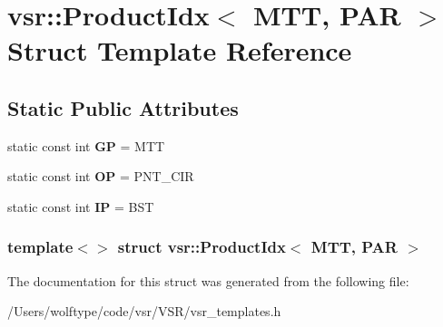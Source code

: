 \hypertarget{structvsr_1_1_product_idx_3_01_m_t_t_00_01_p_a_r_01_4}{\section{vsr\-:\-:Product\-Idx$<$ M\-T\-T, P\-A\-R $>$ Struct Template Reference}
\label{structvsr_1_1_product_idx_3_01_m_t_t_00_01_p_a_r_01_4}
}
\subsection*{Static Public Attributes}
\begin{DoxyCompactItemize}
\item 
\hypertarget{structvsr_1_1_product_idx_3_01_m_t_t_00_01_p_a_r_01_4_a1d387b61aef337080e0bf1725d1f98f7}{static const int {\bfseries G\-P} = M\-T\-T}\label{structvsr_1_1_product_idx_3_01_m_t_t_00_01_p_a_r_01_4_a1d387b61aef337080e0bf1725d1f98f7}

\item 
\hypertarget{structvsr_1_1_product_idx_3_01_m_t_t_00_01_p_a_r_01_4_ae6087bbe01ab77367eac01e0d8d0fcc9}{static const int {\bfseries O\-P} = P\-N\-T\-\_\-\-C\-I\-R}\label{structvsr_1_1_product_idx_3_01_m_t_t_00_01_p_a_r_01_4_ae6087bbe01ab77367eac01e0d8d0fcc9}

\item 
\hypertarget{structvsr_1_1_product_idx_3_01_m_t_t_00_01_p_a_r_01_4_ac71299667ac4fff740a019697337f766}{static const int {\bfseries I\-P} = B\-S\-T}\label{structvsr_1_1_product_idx_3_01_m_t_t_00_01_p_a_r_01_4_ac71299667ac4fff740a019697337f766}

\end{DoxyCompactItemize}
\subsubsection*{template$<$$>$ struct vsr\-::\-Product\-Idx$<$ M\-T\-T, P\-A\-R $>$}



The documentation for this struct was generated from the following file\-:\begin{DoxyCompactItemize}
\item 
/\-Users/wolftype/code/vsr/\-V\-S\-R/vsr\-\_\-templates.\-h\end{DoxyCompactItemize}
